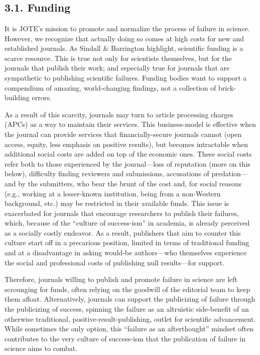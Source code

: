 \documentclass{article}
\begin{document}
\section{\textbf{}}

\subsection{3.1. Funding}

It is JOTE's mission to promote and normalize the process of failure in science. However, we recognize that actually doing so comes at high costs for new and established journals. As Sindall \& Barrington highlight, scientific funding is a scarce resource. This is true not only for scientists themselves, but for the journals that publish their work; and especially true for journals that are sympathetic to publishing scientific failures. Funding bodies want to support a compendium of amazing, world-changing findings, not a collection of brick-building errors. 

As a result of this scarcity, journals may turn to article processing charges (APCs) as a way to maintain their services. This business-model is effective when the journal can provide services that financially-secure journals cannot (open access, equity, less emphasis on positive results), but becomes intractable when additional social costs are added on top of the economic ones. These social costs refer both to those experienced by the journal—loss of reputation (more on this below), difficulty finding reviewers and submissions, accusations of predation—and by the submitters, who bear the brunt of the cost and, for social reasons (e.g., working at a lesser-known institution, being from a non-Western background, etc.) may be restricted in their available funds. This issue is exacerbated for journals that encourage researchers to publish their failures, which, because of the “culture of success-ism” in academia, is already perceived as a socially costly endeavor. As a result, publishers that aim to counter this culture start off in a precarious position, limited in terms of traditional funding and at a disadvantage in asking would-be authors—who themselves experience the social and professional costs of publishing null results—for support. 

Therefore, journals willing to publish and promote failure in science are left scrounging for funds, often relying on the goodwill of the editorial team to keep them afloat. Alternatively, journals can support the publicizing of failure through the publicizing of success, spinning the failure as an altruistic side-benefit of an otherwise traditional, positive-result-publishing, outlet for scientific advancement. While sometimes the only option, this “failure as an afterthought” mindset often contributes to the very culture of success-ism that the publication of failure in science aims to combat. 
\end{document}
